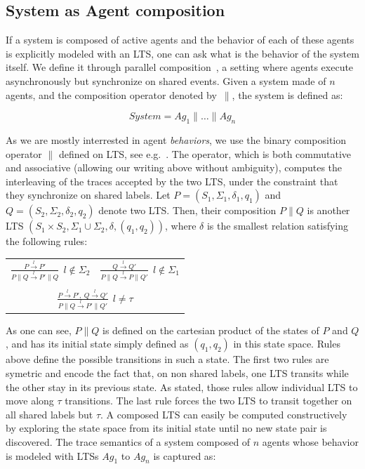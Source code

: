 \subsection{System as Agent composition}

If a system is composed of active agents and the behavior of each of these agents is explicitly modeled with an LTS, one can ask what is the behavior of the system itself. We define it through parallel composition~\cite{Hoare:1985}, a setting where agents execute asynchronously but synchronize on shared events. Given a system made of $n$ agents, and the composition operator denoted by~$\parallel$, the system is defined as:

\begin{equation}
System = Ag_1 \parallel \ldots \parallel Ag_n
\end{equation}

As we are mostly interrested in agent \emph{behaviors}, we use the binary composition operator $\parallel$ defined on LTS, see e.g.~\cite{Giannakopoulou:1999, Magee:1999}. The operator, which is both commutative and associative (allowing our writing above without ambiguity), computes the interleaving of the traces accepted by the two LTS, under the constraint that they synchronize on shared labels. Let $P = (S_1,\Sigma_1,\delta_1,q_{1})$ and $Q = (S_2,\Sigma_2,\delta_2,q_{2})$ denote two LTS. Then, their composition $P \parallel Q$ is another LTS $(S_1 \times S_2,\Sigma_1\cup\Sigma_2,\delta,(q_1,q_2))$, where $\delta$ is the smallest relation satisfying the following rules:

\begin{center}
\begin{tabular}{cc}
$\frac{\displaystyle P \stackrel{l}{\longrightarrow} P'}{\displaystyle P \parallel Q \stackrel{l}{\longrightarrow} P' \parallel Q}~~l \notin \Sigma_2$ &
$\frac{\displaystyle Q \stackrel{l}{\longrightarrow} Q'}{\displaystyle P \parallel Q \stackrel{l}{\longrightarrow} P \parallel Q'}~~l \notin \Sigma_1$ \\
 & \\
\multicolumn{2}{c}{$\frac{\displaystyle P \stackrel{l}{\longrightarrow} P',~Q \stackrel{l}{\longrightarrow} Q'}{\displaystyle P \parallel Q \stackrel{l}{\longrightarrow} P' \parallel Q'}~~l \neq \tau$} \\
\end{tabular}
\end{center}

As one can see, $P \parallel Q$ is defined on the cartesian product of the states of $P$ and $Q$, and has its initial state simply defined as $(q_1,q_2)$ in this state space. Rules above define the possible transitions in such a state. The first two rules are symetric and encode the fact that, on non shared labels, one LTS transits while the other stay in its previous state. As stated, those rules allow individual LTS to move along $\tau$ transitions. The last rule forces the two LTS to transit together on all shared labels but $\tau$. A composed LTS can easily be computed constructively by exploring the state space from its initial state until no new state pair is discovered. The trace semantics of a system composed of $n$ agents whose behavior is modeled with LTSs $Ag_1$ to $Ag_n$ is captured as:

